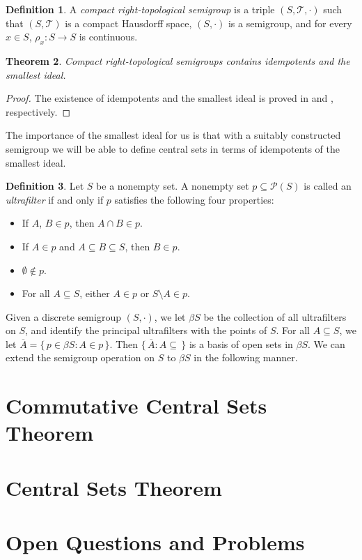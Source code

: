 \documentclass[12pt]{article}
\theoremstyle{plain}
\newtheorem{thm}{Theorem}[section]
\theoremstyle{definition}
\newtheorem{defn}[thm]{Definition}
\newcommand{\calP}{\mathcal{P}}
\newcommand{\calT}{\mathcal{T}}
\begin{document}
\begin{defn}
  A \textsl{compact right-topological semigroup} is a triple $(S,
  \calT, \cdot)$ such that $(S, \calT)$ is a compact Hausdorff space, $(S, \cdot)$ is
  a semigroup, and for every $x \in S$, $\rho_x \colon S
  \to S$ is continuous. 
\end{defn}

\begin{thm}
  Compact right-topological semigroups contains idempotents and
  the smallest ideal.
\end{thm}
\begin{proof}
  The existence of idempotents and the smallest ideal is proved in \cite[Theorem
  2.5]{Hindman:1998fk} and \cite[Theorem 2.8]{Hindman:1998fk}, respectively.
\end{proof}
The importance of the smallest ideal for us is that with a suitably
constructed semigroup we will be able to define central sets in terms
of idempotents of the smallest ideal.

\begin{defn}
  Let $S$ be a nonempty set.
  A nonempty set $p \subseteq \calP(S)$ is called an
  \textsl{ultrafilter} if and only if $p$ satisfies the following
  four properties: 
  \begin{itemize}
    \item[(1)] If $A$, $B \in p$, then $A \cap B \in p$.
    \item[(2)] If $A \in p$ and $A \subseteq B \subseteq S$, then $B
      \in p$.
    \item[(3)] $\emptyset \not\in p$.
    \item[(4)] For all $A \subseteq S$, either $A \in p$ or $S
      \setminus A \in p$. 
  \end{itemize}
\end{defn}

Given a discrete semigroup $(S,\cdot)$, we let $\beta S$ be the
collection of all ultrafilters on $S$, and identify the principal
ultrafilters with the points of $S$. 
For all $A \subseteq S$, we let $\overline{A} = \{\, p \in \beta S : A
\in p \,\}$. 
Then $\{\, \overline{A} : A \subseteq \,\}$ is a basis of open sets in
$\beta S$.
We can extend the semigroup operation on $S$ to $\beta S$ in the
following manner.

\section{Commutative Central Sets Theorem}
\section{Central Sets Theorem}
\section{Open Questions and Problems}

\theendnotes



\end{document}
